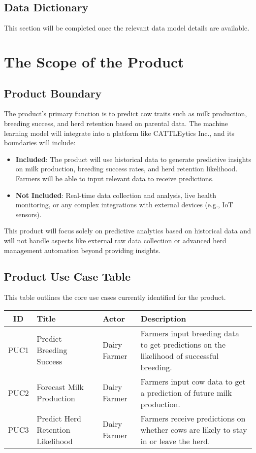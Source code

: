 \documentclass[12pt]{article}
\begin{document}
\subsection{Data Dictionary}
This section will be completed once the relevant data model details are available.

\section{The Scope of the Product}

\subsection{Product Boundary}
The product's primary function is to predict cow traits such as milk production, 
breeding success, and herd retention based on parental data. The machine learning 
model will integrate into a platform like CATTLEytics Inc., and its 
boundaries will include:

\begin{itemize}
    \item \textbf{Included}: The product will use historical data to generate 
    predictive insights on milk production, breeding success rates, and herd 
    retention likelihood. Farmers will be able to input relevant data to 
    receive predictions.
    \item \textbf{Not Included}: Real-time data collection and analysis, 
    live health monitoring, or any complex integrations with external devices 
    (e.g., IoT sensors).
\end{itemize}

This product will focus solely on predictive analytics based on historical data 
and will not handle aspects like external raw data collection or advanced herd management 
automation beyond providing insights.

\subsection{Product Use Case Table}
This table outlines the core use cases currently identified for the product.

\begin{table}[h!]
\centering
\begin{tabularx}{\textwidth}{|c|l|l|X|}
    \hline
    \textbf{ID} & \textbf{Title} & \textbf{Actor} & \textbf{Description} \\
    \hline
    PUC1 & Predict Breeding Success & Dairy Farmer & Farmers input breeding 
    data to get predictions on the likelihood of successful breeding. \\
    \hline
    PUC2 & Forecast Milk Production & Dairy Farmer & Farmers input cow data 
    to get a prediction of future milk production. \\
    \hline
    PUC3 & Predict Herd Retention Likelihood & Dairy Farmer & Farmers receive 
    predictions on whether cows are likely to stay in or leave the herd. \\
    \hline
\end{tabularx}
\end{table}
\end{document}
